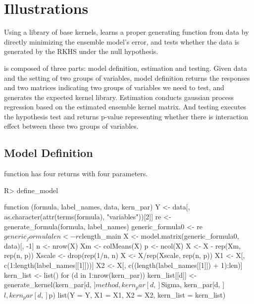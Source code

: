 \documentclass[article]{jss}
\begin{document}
\section{Illustrations} \label{sec:illustrations}

Using a library of base kernels,  learns a proper generating function from data by directly minimizing the ensemble model’s error, and tests whether the data is generated by the RKHS under the null hypothesis.

 is composed of three parts: model definition, estimation and testing. Given data and the setting of two groups of variables, model definition returns the responses and two matrices indicating two groups of variables we need to test, and generates the expected kernel library. Estimation conducts gaussian process regression based on the estimated ensemble kernel matrix. And testing executes the hypothesis test and returns p-value representing whether there is interaction effect between these two groups of variables.

\subsection{Model Definition}

 function has four returns with four parameters.
\begin{CodeChunk}
\begin{CodeInput}
R> define_model
\end{CodeInput}
\begin{CodeOutput}
 function (formula, label_names, data, kern_par) 
 {
     Y <- data[, as.character(attr(terms(formula), "variables"))[2]]
     re <- generate_formula(formula, label_names)
     generic_formula0 <- re$generic_formula
     len <- re$length_main
     X <- model.matrix(generic_formula0, data)[, -1]
     n <- nrow(X)
     Xm <- colMeans(X)
     p <- ncol(X)
     X <- X - rep(Xm, rep(n, p))
     Xscale <- drop(rep(1/n, n) %
     X <- X/rep(Xscale, rep(n, p))
     X1 <- X[, c(1:length(label_names[[1]]))]
     X2 <- X[, c((length(label_names[[1]]) + 1):len)]
     kern_list <- list()
     for (d in 1:nrow(kern_par)) {
         kern_list[[d]] <- generate_kernel(kern_par[d, ]$method, 
             kern_par[d, ]$Sigma, kern_par[d, ]$l, kern_par[d, 
                 ]$p)
     }
     list(Y = Y, X1 = X1, X2 = X2, kern_list = kern_list)
 }
\end{CodeOutput}
\end{CodeChunk}
\end{document}
